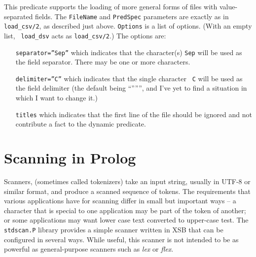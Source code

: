 \begin{description}

This predicate supports the loading of more general forms of files
with value-separated fields.  The {\tt FileName} and {\tt PredSpec}
parameters are exactly as in {\tt load\_csv/2}, as described just
above.  {\tt Options} is a list of options.  (With an empty list, {\tt
load\_dsv} acts as {\tt load\_csv/2}.)  The options are:
\begin{itemize}
\item[{\tt separator=''Sep''}] which indicates that the character(s) {\tt Sep}
will be used as the field separator.  There may be one or more
characters. 
\item[{\tt delimiter=''C''}] which indicates that the single character {\tt
C} will be used as the field delimiter (the default being ``'''''',
and I've yet to find a situation in which I want to change it.)
\item[{\tt titles}] which indicates that the first line of the file should
be ignored and not contribute a fact to the dynamic predicate.
\end{itemize}

\end{description}

\section{Scanning in Prolog}

Scanners, (sometimes called tokenizers) take an input string, usually
in UTF-8 or similar format, and produce a scanned sequence of tokens.
The requirements that various applications have for scanning differ in
small but important ways -- a character that is special to one
application may be part of the token of another; or some applications
may want lower case text converted to upper-case test.  The {\tt
stdscan.P} library provides a simple scanner written in XSB that can
be configured in several ways.  While useful, this scanner is not
intended to be as powerful as general-purpose scanners such as {\em
lex} or {\em flex}.

